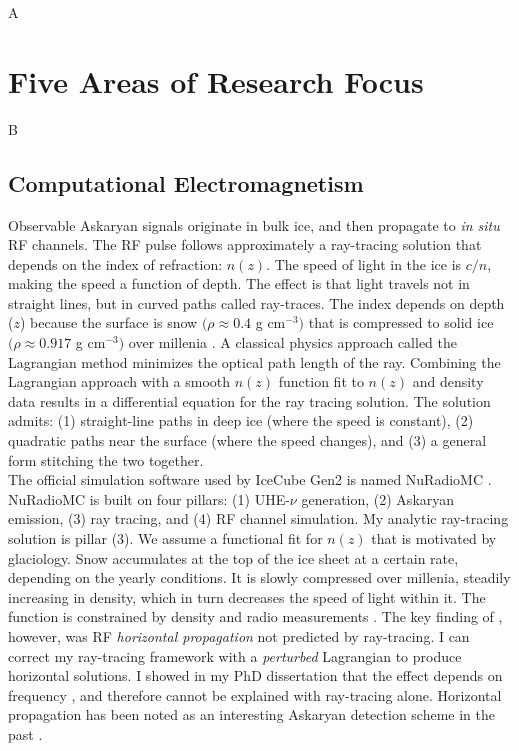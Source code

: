 \documentclass[../../../main.tex]{subfiles}
\begin{document}
A
\section{Five Areas of Research Focus}
B
\subsection{Computational Electromagnetism}

Observable Askaryan signals originate in bulk ice, and then propagate to \textit{in situ} RF channels.  The RF pulse follows approximately a ray-tracing solution that depends on the index of refraction: $n(z)$.  The speed of light in the ice is $c/n$, making the speed a function of depth.  The effect is that light travels not in straight lines, but in curved paths called ray-traces.  The index depends on depth ($z$) because the surface is snow $(\rho \approx 0.4$ g cm$^{-3})$ that is compressed to solid ice $(\rho \approx 0.917$ g cm$^{-3})$ over millenia \cite{10.3189/2015jog14j214}.  A classical physics approach called the Lagrangian method minimizes the optical path length of the ray. Combining the Lagrangian approach with a smooth $n(z)$ function fit to $n(z)$ and density data results in a differential equation for the ray tracing solution.  The solution admits: (1) straight-line paths in deep ice (where the speed is constant), (2) quadratic paths near the surface (where the speed changes), and (3) a general form stitching the two together.
\\
\vspace{0.25cm}
The official simulation software used by IceCube Gen2 is named NuRadioMC \cite{10.1140/epjc/s10052-020-7612-8}.  NuRadioMC is built on four pillars: (1) UHE-$\nu$ generation, (2) Askaryan emission, (3) ray tracing, and (4) RF channel simulation.  My analytic ray-tracing solution is pillar (3).  We assume a functional fit for $n(z)$ that is motivated by glaciology.  Snow accumulates at the top of the ice sheet at a certain rate, depending on the yearly conditions.  It is slowly compressed over millenia, steadily increasing in density, which in turn decreases the speed of light within it.  The function is constrained by density and radio measurements \cite{Barwick:2018497}.  The key finding of \cite{Barwick:2018497}, however, was RF \textit{horizontal propagation} not predicted by ray-tracing.  I can correct my ray-tracing framework with a \textit{perturbed} Lagrangian to produce horizontal solutions.  I showed in my PhD dissertation that the effect depends on frequency \cite{hanson}, and therefore cannot be explained with ray-tracing alone.  Horizontal propagation has been noted as an interesting Askaryan detection scheme in the past \cite{10.1103/physrevd.71.011503}.
\end{document}
